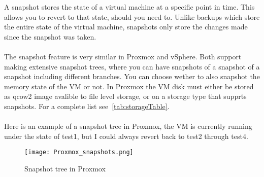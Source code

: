 A snapshot stores the state of a virtual machine at a specific point in time. This allows you to revert to that state, should you need to. Unlike backups which store the entire state of the virtual machine, snapshots only store the changes made since the snapshot was taken.
\\\\
The snapshot feature is very similar in Proxmox and vSphere. Both support making extensive snapshot trees, where you can have snapshots of a snapshot of a snapshot including different branches. You can choose wether to also snapshot the memory state of the VM or not. In Proxmox the VM disk must either be stored as qcow2 image avalible to file level storage, or on a storage type that supprts snapshots. For a complete list see~\ref{tab:storageTable}.
\\\\
Here is an example of a snapshot tree in Proxmox, the VM is currently running under the state of test1, but I could always revert back to test2 through test4.

\begin{figure}[H]
	\centering
	\texttt{[image: Proxmox\_snapshots.png]} %
	\caption{Snapshot tree in Proxmox} %
	\label{fig:Snapshot tree in Proxmox} %
\end{figure}
